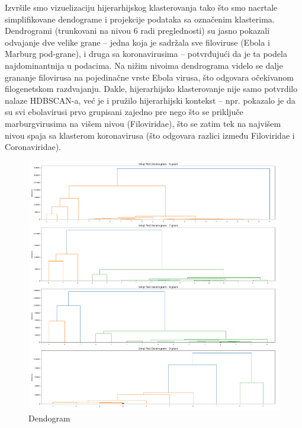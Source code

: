 \documentclass[a4paper,12pt]{article}
\begin{document}
Izvršile smo vizuelizaciju hijerarhijskog klasterovanja tako što smo nacrtale simplifikovane dendograme i projekcije podataka sa označenim klasterima. Dendrogrami (trunkovani na nivou 6 radi preglednosti) su jasno pokazali odvajanje dve velike grane – jedna koja je sadržala sve filoviruse (Ebola i Marburg pod-grane), i druga sa koronavirusima – potvrđujući da je ta podela najdominantnija u podacima. Na nižim nivoima dendrograma
videlo se dalje grananje filovirusa na pojedinačne vrste Ebola virusa, što odgovara očekivanom filogenetskom razdvajanju. Dakle, hijerarhijsko klasterovanje nije samo potvrdilo nalaze HDBSCAN-a, već je i pružilo hijerarhijski kontekst – npr. pokazalo je da su svi ebolavirusi prvo grupisani zajedno pre nego što se priključe marburgvirusima na višem nivou (Filoviridae), što se zatim tek na najvišem nivou spaja sa klasterom koronavirusa (što odgovara razlici između Filoviridae i Coronaviridae).

\begin{figure}[h!]
    \centering
    \includegraphics[width=1.2\textwidth]{images/hc_den_nuk.png}
    \caption{Dendogram}
    \label{fig:hc_ded}
\end{figure}

\newpage
\end{document}

